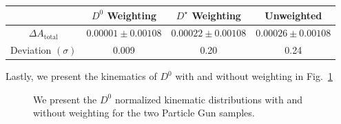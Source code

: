 \documentclass{article}
\begin{document}
        \begin{center}
                \begin{tabular}{c|c|c|c}
                        & $D^0$ Weighting & $D^\star$ Weighting & Unweighted\\
                        \hline\hline
                        $\Delta A_\text{total}$ & $0.00001 \pm 0.00108$ & $0.00022 \pm 0.00108$ & $0.00026 \pm 0.00108$\\
                        \hline
                        Deviation $(\sigma)$ & 0.009 & 0.20 & 0.24\\
                \end{tabular}
                \label{tab:asymmetry_difference_pgun}
        \end{center}

        Lastly, we present the kinematics of $D^0$ with and without weighting in Fig.~\ref{fig:kimenaticspgun}

        \begin{figure}[h!]
                \centering
                \hfill

                \caption{We present the $D^0$ normalized kinematic distributions with and without weighting for the two Particle Gun samples.}
                \label{fig:kimenaticspgun}
        \end{figure}
\end{document}
